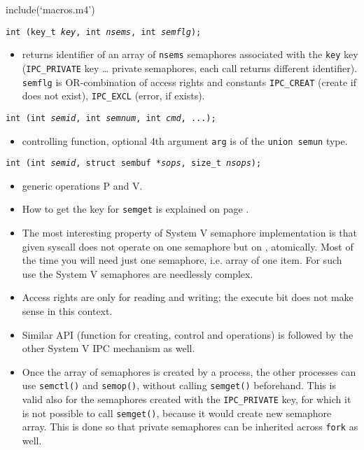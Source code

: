 include(`macros.m4')


\begin{slide}
\texttt{int (key\_t \emph{key}, int \emph{\texttt{nsems}},
int \emph{\texttt{semflg}});}
\begin{itemize}
\item returns identifier of an array of \texttt{nsems} semaphores associated
with the \texttt{key} key (\texttt{IPC\_PRIVATE} key \dots{} private semaphores,
each call returns different identifier). 
\texttt{semflg} is OR-combination of access rights and constants
\texttt{IPC\_CREAT} (create if does not exist),
\texttt{IPC\_EXCL} (error, if exists). 
\end{itemize}
\texttt{int (int \emph{\texttt{semid}},
int \emph{\texttt{semnum}}, int \emph{\texttt{cmd}}, ...);}
\begin{itemize}
\item controlling function, optional 4th argument \texttt{arg} is of the
\texttt{union~semun} type.
\end{itemize}
\texttt{int (int \emph{\texttt{semid}},
struct sembuf *\emph{\texttt{sops}}, size\_t \emph{\texttt{nsops}});}
\begin{itemize}
\item generic operations P and V.
\end{itemize}
\end{slide}

\label{SYSVSEM}

\begin{itemize}
\item How to get the key for \texttt{semget} is explained on page
\pageref{FTOK}.
\item The most interesting property of System V semaphore implementation is
that given syscall does not operate on one semaphore but on , atomically.
Most of the time you will need just one semaphore, i.e. array of one item.
For such use the System V semaphores are needlessly complex.
\item Access rights are only for reading and writing; the execute bit does not
make sense in this context.
\item Similar API (function for creating, control and operations) is followed by
the other System V IPC mechanism as well.
\item Once the array of semaphores is created by a process, the other processes
can use \texttt{semctl()} and \texttt{semop()}, without calling
\texttt{semget()} beforehand. This is valid also for the semaphores created with
the \texttt{IPC\_PRIVATE} key, for which it is not possible to call
\texttt{semget()}, because it would create new semaphore array. This is done so
that private semaphores can be inherited across \texttt{fork} as well.
\end{itemize}

